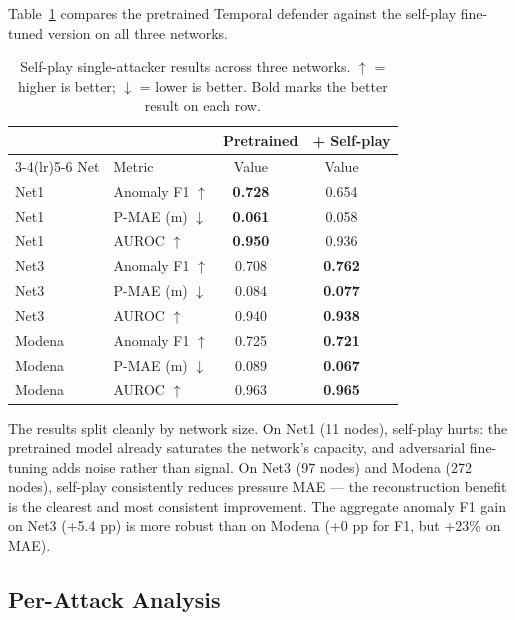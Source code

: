 Table~\ref{tab:selfplay_three_nets} compares the pretrained Temporal
\moe{} defender against the self-play fine-tuned version on all
three networks.

\begin{table}[htbp]
  \centering
  \caption{Self-play single-attacker results across three networks.
  $\uparrow$ = higher is better; $\downarrow$ = lower is better.
  Bold marks the better result on each row.}
  \label{tab:selfplay_three_nets}
  \begin{tabular}{llcccc}
    \toprule
    & & \multicolumn{2}{c}{Pretrained} &
      \multicolumn{2}{c}{+ Self-play} \\
    \cmidrule(lr){3-4}\cmidrule(lr){5-6}
    Net & Metric & Value & & Value & \\
    \midrule
    Net1 & Anomaly F1 $\uparrow$   & \textbf{0.728} & & 0.654 & \\
    Net1 & P-MAE (m) $\downarrow$  & \textbf{0.061} & & 0.058 & \\
    Net1 & AUROC $\uparrow$        & \textbf{0.950} & & 0.936 & \\
    \midrule
    Net3 & Anomaly F1 $\uparrow$   & 0.708 & & \textbf{0.762} & \\
    Net3 & P-MAE (m) $\downarrow$  & 0.084 & & \textbf{0.077} & \\
    Net3 & AUROC $\uparrow$        & 0.940 & & \textbf{0.938} & \\
    \midrule
    Modena & Anomaly F1 $\uparrow$ & 0.725 & & \textbf{0.721} & \\
    Modena & P-MAE (m) $\downarrow$& 0.089 & & \textbf{0.067} & \\
    Modena & AUROC $\uparrow$      & 0.963 & & \textbf{0.965} & \\
    \bottomrule
  \end{tabular}
\end{table}

The results split cleanly by network size. On Net1 (11 nodes),
self-play hurts: the pretrained model already saturates the network's
capacity, and adversarial fine-tuning adds noise rather than signal.
On Net3 (97 nodes) and Modena (272 nodes), self-play consistently
reduces pressure MAE — the reconstruction benefit is the
clearest and most consistent improvement. The aggregate anomaly F1
gain on Net3 (+5.4 pp) is more robust than on Modena (+0 pp for
F1, but +23\% on MAE).

\subsection{Per-Attack Analysis}

